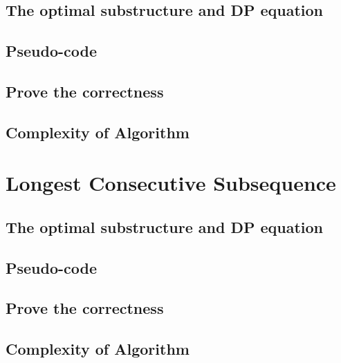 \documentclass{article}
\begin{document}
\begin{CJK*}{UTF8}{gbsn}
\subsection{The optimal substructure and DP equation}
\subsection{Pseudo-code}
\subsection{Prove the correctness}
\subsection{Complexity of Algorithm}

\clearpage
\section{Longest Consecutive Subsequence}
\subsection{The optimal substructure and DP equation}
\subsection{Pseudo-code}
\subsection{Prove the correctness}
\subsection{Complexity of Algorithm}
\end{CJK*}
\end{document}
